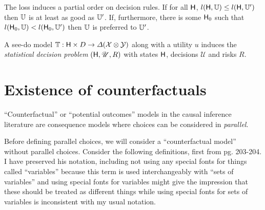 The loss induces a partial order on decision rules. If for all $\mathsf{H}$, $l(\mathsf{H},\mathbb{U})\leq l(\mathsf{H},\mathbb{U}')$ then $\mathbb{U}$ is at least as good as $\mathbb{U}'$. If, furthermore, there is some $\mathsf{H}_0$ such that $l(\mathsf{H}_0,\mathbb{U})<l(\mathsf{H}_0,\mathbb{U}')$ then $\mathbb{U}$ is preferred to $\mathbb{U}'$.

\begin{definition}
A see-do model $\mathbb{T}:\mathsf{H}\times D\to \Delta(\mathcal{X}\otimes\mathcal{Y})$ along with a utility $u$ induces the \emph{statistical decision problem} $(\mathsf{H},\mathscr{U},R)$ with states $\mathsf{H}$, decisions $\mathscr{U}$ and risks $R$.


\end{definition}


\section{Existence of counterfactuals}


``Counterfactual'' or ``potential outcomes'' models in the causal inference literature are consequence models where choices can be considered in \emph{parallel}. 

Before defining parallel choices, we will consider a ``counterfactual model'' without parallel choices. Consider the following definitions, first from \citet{pearl_causality:_2009} pg. 203-204. I have preserved his notation, including not using any special fonts for things called ``variables'' because this term is used interchangeably with ``sets of variables'' and using special fonts for variables might give the impression that these should be treated as different things while using special fonts for sets of variables is inconsistent with my usual notation.


\vspace{1cm}

